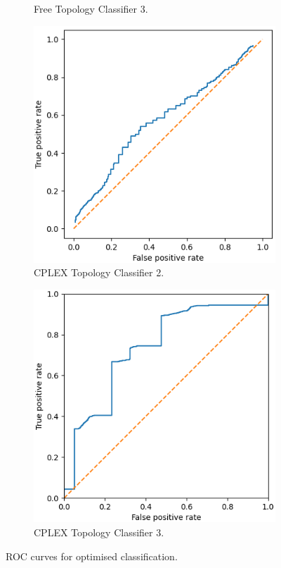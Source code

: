 \begin{figure}[H]
\begin{subfigure}[H]{0.475\textwidth}
        \caption{Free Topology Classifier 3.}
    \end{subfigure}
    \begin{subfigure}[H]{0.475\textwidth}
        \includegraphics[width=\textwidth]{figs/results/metric_normilisation/norway_ac2.png}
        \caption{CPLEX Topology Classifier 2.}
    \end{subfigure}
    \begin{subfigure}[H]{0.475\textwidth}
        \includegraphics[width=\textwidth]{figs/results/metric_normilisation/norway_ac3.png}
        \caption{CPLEX Topology Classifier 3.}
    \end{subfigure}
    \caption{ROC curves for optimised classification.}
    \label{fig:RmetricnormROCcurves}
\end{figure}

